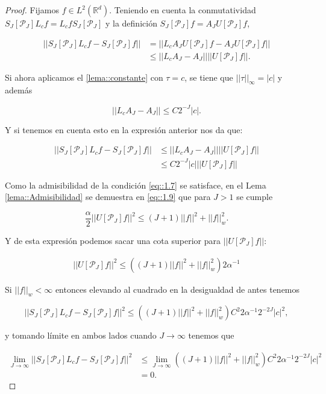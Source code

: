 \begin{proof}

\noindent Fijamos $f\in L^2(\mathbb{R}^d)$. Teniendo en cuenta la conmutatividad $S_J[\mathcal{P}_J] L_cf = L_cf S_J[\mathcal{P}_J]$ y la definición $S_J[\mathcal{P}_J]f=A_J U[\mathcal{P}_J]f$,

\begin{align*}
    ||S_J[\mathcal{P}_J] L_cf - S_J[\mathcal{P}_J]f || &= ||L_c A_J U[\mathcal{P}_J]f - A_J U[\mathcal{P}_J]f|| \\
    &\leq ||L_c A_J - A_J|| ||U[\mathcal{P}_J]f||.
\end{align*}

\medskip

\noindent Si ahora aplicamos el \autoref{lema::constante} con $\tau=c$, se tiene que $||\tau||_\infty=|c|$ y además

$$||L_c A_J - A_J|| \leq C 2^{-J} |c|.$$

\noindent Y si tenemos en cuenta esto en la expresión anterior nos da que: 

\begin{align*}
  ||S_J[\mathcal{P}_J] L_cf - S_J[\mathcal{P}_J]f || & \leq ||L_c A_J - A_J|| ||U[\mathcal{P}_J]f|| \\
  & \leq C 2^{-J} |c| ||U[\mathcal{P}_J]f||
\end{align*}

\noindent Como la admisibilidad de la condición \eqref{eq::1.7} se satisface, en el Lema \ref{lema::Admisibilidad} se demuestra en \eqref{eq::1.9} que para $J>1$ se cumple

$$\frac{\alpha}{2}||U[\mathcal{P}_J]f||^2 \leq (J+1)||f||^2+||f||^2_w.$$

\noindent Y de esta expresión podemos sacar una cota superior para $||U[\mathcal{P}_J]f||$: 

\begin{align*}
  ||U[\mathcal{P}_J]f||^2 \leq ((J+1)||f||^2+||f||^2_w) 2 \alpha^{-1}
\end{align*}

\noindent Si $||f||_w < \infty$ entonces elevando al cuadrado en la desigualdad de antes tenemos

$$||S_J[\mathcal{P}_J] L_cf - S_J[\mathcal{P}_J]f ||^2 \leq ((J+1)||f||^2+||f||_w^2)C^2 2 \alpha^{-1} 2^{-2J} |c|^2,$$

\noindent y tomando límite en ambos lados cuando $J\rightarrow \infty$ tenemos que 

\begin{align*}
  \lim_{J\rightarrow \infty} ||S_J[\mathcal{P}_J] L_cf - S_J[\mathcal{P}_J]f ||^2 &\leq \lim_{J\rightarrow \infty} ((J+1)||f||^2+||f||_w^2)C^2 2 \alpha^{-1} 2^{-2J} |c|^2 \\
  &= 0.
\end{align*}


\end{proof}
